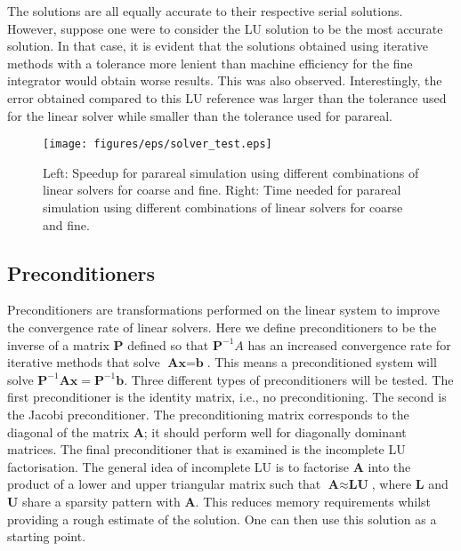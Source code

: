 The solutions are all equally accurate to their respective serial solutions. However, suppose one were to consider the LU solution to be the most accurate solution. In that case, it is evident that the solutions obtained using iterative methods with a tolerance more lenient than machine efficiency for the fine integrator would obtain worse results. This was also observed. Interestingly, the error obtained compared to this LU reference was larger than the tolerance used for the linear solver while smaller than the tolerance used for parareal.
  \begin{figure}[h]
    \centering
    \texttt{[image: figures/eps/solver\_test.eps]}
    \caption{Left: Speedup for parareal simulation using different combinations of linear solvers for coarse and fine. Right: Time needed for parareal simulation using different combinations of linear solvers for coarse and fine.}
    \label{fig: linear solver combination}
\end{figure}

\subsection{Preconditioners}
Preconditioners are transformations performed on the linear system to improve the convergence rate of linear solvers. Here we define preconditioners to be the inverse of a matrix $\textbf{P}$ defined so that $\textbf{P}^{-1}A$ has an increased convergence rate for iterative methods that solve $\textbf{Ax} = \textbf{b}$. This means a preconditioned system will solve $\textbf{P}^{-1}\textbf{Ax} = \textbf{P}^{-1}\textbf{b}$. Three different types of preconditioners will be tested. The first preconditioner is the identity matrix, i.e., no preconditioning. The second is the Jacobi preconditioner. The preconditioning matrix corresponds to the diagonal of the matrix $\textbf{A}$; it should perform well for diagonally dominant matrices. The final preconditioner that is examined is the incomplete LU factorisation. The general idea of incomplete LU is to factorise $\textbf{A}$ into the product of a lower and upper triangular matrix such that $\textbf{A} \approx \textbf{LU}$, where $\textbf{L}$ and $\textbf{U}$ share a sparsity pattern with $\textbf{A}$. This reduces memory requirements whilst providing a rough estimate of the solution. One can then use this solution as a starting point.


